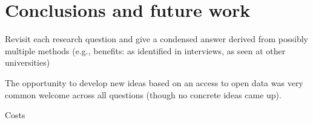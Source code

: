 \section{Conclusions and future work}
Revisit each research question and give a condensed answer derived from possibly multiple methods (e.g., benefits: as identified in interviews, as seen at other universities)


The opportunity to develop new ideas based on an access to open data was very common welcome across all questions (though no concrete ideas came up). 

Costs